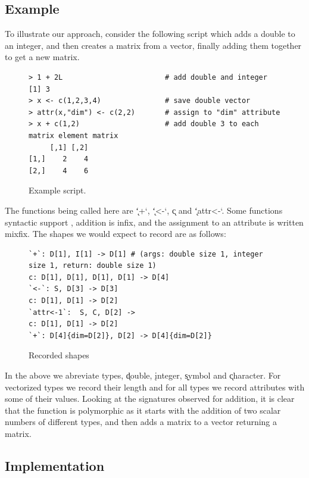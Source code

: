 \documentclass[acmsmall,10pt,review,anonymous]{acmart}\settopmatter{printfolios=true,printccs=false,printacmref=false}
\begin{document}
\subsection{Example}

To illustrate our approach, consider the following script which adds a double to an integer, and then creates a matrix from a vector, finally adding them together to get a new matrix.

\begin{figure}[!hb]{\small\begin{lstlisting}[style=R]
> 1 + 2L                        # add double and integer
[1] 3
> x <- c(1,2,3,4)               # save double vector
> attr(x,"dim") <- c(2,2)       # assign to "dim" attribute
> x + c(1,2)                    # add double 3 to each matrix element matrix
     [,1] [,2]
[1,]    2    4
[2,]    4    6
\end{lstlisting}}\caption{Example script.}\label{example}\end{figure}

The functions being called here are \k{`+`}, \k{`<-`}, \k{c} and
\k{`attr<-`}.  Some functions syntactic support , addition is infix, and the
assignment to an attribute is written mixfix. The shapes we would expect to
record are as follows:

\begin{figure}[!hb]{\small\begin{lstlisting}[style=R]
`+`: D[1], I[1] -> D[1] # (args: double size 1, integer size 1, return: double size 1)
c: D[1], D[1], D[1], D[1] -> D[4]
`<-`: S, D[3] -> D[3]
c: D[1], D[1] -> D[2]
`attr<-1`:  S, C, D[2] -> 
c: D[1], D[1] -> D[2]
`+`: D[4]{dim=D[2]}, D[2] -> D[4]{dim=D[2]}
\end{lstlisting}}\caption{Recorded shapes}\label{shapes}\end{figure}

In the above we abreviate types, \k{double}, \k{integer}, \k{symbol} and
\k{character}. For vectorized types we record their length and for all types
we record attributes with some of their values. Looking at the signatures
observed for addition, it is clear that the function is polymorphic as it
starts with the addition of two scalar numbers of different types, and then
adds a matrix to a vector returning a matrix.

\subsection{Implementation}
\end{document}
